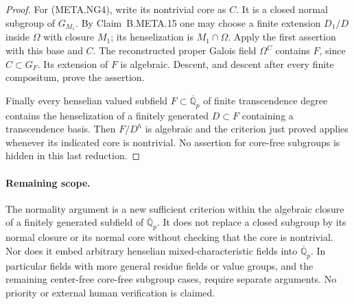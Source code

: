 \begin{proof}
For (META.NG4), write its nontrivial core
as $C$.  It is a closed normal subgroup
of $G_{M_1}$.
By Claim~B.META.15 one may choose a finite
extension $D_1/D$ inside $\Omega$ with
closure $M_1$; its henselization is
$M_1\cap\Omega$.
Apply the first assertion with this base
and $C$.
The reconstructed proper Galois field
$\Omega^C$ contains $F$, since $C\subset G_F$.
Its extension of $F$ is algebraic.
Descent, and descent after every finite
compositum, prove the assertion.

Finally every henselian valued subfield
$F\subset\overline{\mathbb Q}_p$ of
finite transcendence degree contains the
henselization of a finitely generated
$D\subset F$ containing a transcendence
basis.  Then $F/D^h$ is algebraic and
the criterion just proved applies whenever
its indicated core is nontrivial.
No assertion for core-free subgroups is
hidden in this last reduction.
\end{proof}

\paragraph{Remaining scope.}
The normality argument is a new sufficient
criterion within the algebraic closure of
a finitely generated subfield of
$\overline{\mathbb Q}_p$.
It does not replace a closed subgroup by
its normal closure or its normal core
without checking that the core is nontrivial.
Nor does it embed arbitrary henselian
mixed-characteristic fields into
$\overline{\mathbb Q}_p$.
In particular fields with more general
residue fields or value groups, and the
remaining center-free core-free subgroup
cases, require separate arguments.
No priority or external human verification
is claimed.
